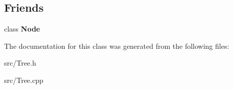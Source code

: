 \subsection*{Friends}
\begin{DoxyCompactItemize}
\item 
\mbox{\label{class_tree_a6db9d28bd448a131448276ee03de1e6d}} 
class {\bfseries Node}
\end{DoxyCompactItemize}


The documentation for this class was generated from the following files\+:\begin{DoxyCompactItemize}
\item 
src/Tree.\+h\item 
src/Tree.\+cpp\end{DoxyCompactItemize}

